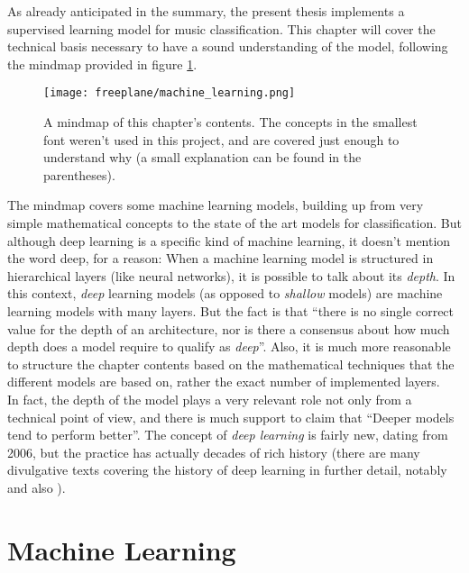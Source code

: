 As already anticipated in the summary, the present thesis implements a supervised learning model for music classification. This chapter will cover the technical basis necessary to have a sound understanding of the model, following the mindmap provided in figure \ref{fig:mindmap}.

\begin{figure}[h]
  \hspace*{-0.6cm}
  \centering
  \texttt{[image: freeplane/machine\_learning.png]}
  \caption{A mindmap of this chapter's contents. The concepts in the smallest font weren't used in this project, and are covered just enough to understand why (a small explanation can be found in the parentheses).}
  \label{fig:mindmap}
\end{figure}


The mindmap covers some machine learning models, building up from very simple mathematical concepts to the state of the art models for classification. But although deep learning is a specific kind of machine learning\cite[p. 98]{goodfellow}, it doesn't mention the word deep, for a reason: When a machine learning model is structured in hierarchical layers (like neural networks), it is possible to talk about its {\it depth}. In this context, {\it deep} learning models (as opposed to {\it shallow} models) are machine learning models with many layers. But the fact is that ``there is no single correct value for the depth of an architecture, nor is there a consensus about how much depth does a model require to qualify as {\it deep}''\cite[p.8]{goodfellow}. Also, it is much more reasonable to structure the chapter contents based on the mathematical techniques that the different models are based on, rather the exact number of implemented layers.\\


In fact, the depth of the model plays a very relevant role not only from a technical point of view, and there is much support to claim that ``Deeper models tend to perform better''\cite[p.202]{goodfellow}. The concept of {\it deep learning} is fairly new, dating from 2006\cite[p.13]{goodfellow}, but the practice has actually decades of rich history (there are many divulgative texts covering the history of deep learning in further detail, notably \cite{deephist} and also \cite[p.13]{goodfellow}).\\



\section{Machine Learning}

